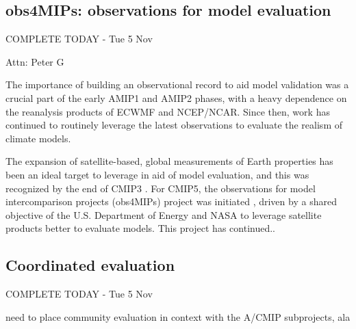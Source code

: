 \documentclass[gmd, preprint]{copernicus}
\newcommand{\mycomment}[1]{}
\def\cred#1{{\color{red}#1}}
\def\cblue#1{{\color{blue}#1}}
\begin{document}
\mycomment{
CMIP3
https://pcmdi.llnl.gov/mips/cmip/ann_20c3m.html
PCMDI IPCC 4AR simulations and forcing Curt/Karl;
https://web.archive.org/web/20040706074446/http://www-pcmdi.llnl.gov/cmip/
https://web.archive.org/web/20040827091054/http://www-pcmdi.llnl.gov/cmip/
CMIP5
https://pcmdi.llnl.gov/mips/cmip5/forcing.html
Old information CMIP paths
/Users/durack1/sync/Docs/admin/LLNL/12/120607_PaulDurack_PCMDI-CMIP5DataMeeting_LLNL.pdf
/Users/durack1/sync/Docs/admin/LLNL/17/151202_covey1_CMIP1And2/151202_covey1-CMIP1Documentation.pdf
/Users/durack1/sync/Docs/admin/LLNL/17/151202_covey1_CMIP1And2/170530_gleckler1_CMIPPaths.pdf
}


\subsection{obs4MIPs: observations for model evaluation}
\cblue{COMPLETE TODAY - Tue 5 Nov}

\cred{Attn: Peter G}

The importance of building an observational record to aid model validation was a crucial part of the early AMIP1 \citep{gates_amip_1992} and AMIP2 \citep{gleckler_amip_1996-1} phases, with a heavy dependence on the reanalysis products of ECWMF and NCEP/NCAR. Since then, work has continued to routinely leverage the latest observations to evaluate the realism of climate models.

The expansion of satellite-based, global measurements of Earth properties has been an ideal target to leverage in aid of model evaluation, and this was recognized by the end of CMIP3 \citep{gleckler_improving_2011,teixeira_satellite_2011}. For CMIP5, the observations for model intercomparison projects (obs4MIPs) project was initiated \citep{teixeira_satellite_2014}, driven by a shared objective of the U.S. Department of Energy and NASA to leverage satellite products better to evaluate models. \cred{This project has continued.. \citep{waliser_observations_2020}}



\subsection{Coordinated evaluation}
\cblue{COMPLETE TODAY - Tue 5 Nov}

\cred{need to place community evaluation in context with the A/CMIP subprojects, ala \citet{gates_amip_1992}}
\end{document}
